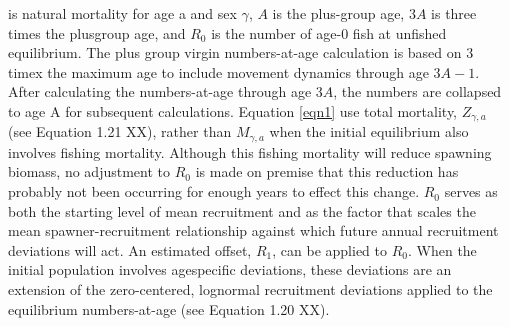 \documentclass[11pt,
  english,
  letterpaper,
]{article}
\begin{document}
{{  \leavevmode\tagmcend\tagstructend\par}\leavevmode\tagmcend\tagstructend} is natural mortality for age a and sex {\(\gamma\)\leavevmode\tagmcend\tagstructend}, {\(A\)\leavevmode\tagmcend\tagstructend} is the plus-group age, {\(3A\)\leavevmode\tagmcend\tagstructend} is three times the plusgroup age, and {\(R_0\)\leavevmode\tagmcend\tagstructend} is the number of age-0 fish at unfished equilibrium. The plus group virgin numbers-at-age calculation is based on 3 timex the maximum age to include movement dynamics through age {\(3A-1\)\leavevmode\tagmcend\tagstructend}. After calculating the numbers-at-age through age {\(3A\)\leavevmode\tagmcend\tagstructend}, the numbers are collapsed to age A for subsequent calculations. Equation \ref{eqn1} use total mortality, {\(Z_{\gamma,a}\)\leavevmode\tagmcend\tagstructend} (see Equation 1.21 XX), rather than {\(M_{\gamma,a}\)\leavevmode\tagmcend\tagstructend} when the initial equilibrium also involves fishing mortality. Although this fishing mortality will reduce spawning biomass, no adjustment to {\(R_0\)\leavevmode\tagmcend\tagstructend} is made on premise that this reduction has probably not been occurring for enough years to effect this change. {\(R_0\)\leavevmode\tagmcend\tagstructend} serves as both the starting level of mean recruitment and as the factor that scales the mean spawner-recruitment relationship against which future annual recruitment deviations will act. An estimated offset, {\(R_1\)\leavevmode\tagmcend\tagstructend}, can be applied to {\(R_0\)\leavevmode\tagmcend\tagstructend}. When the initial population involves agespecific deviations, these deviations are an extension of the zero-centered, lognormal recruitment deviations applied to the equilibrium numbers-at-age (see Equation 1.20 XX).

\leavevmode\tagmcend\tagstructend\par
\end{document}
